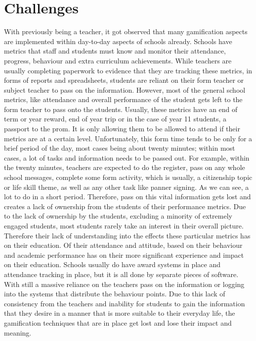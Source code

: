 \documentclass{sigchi}
\begin{document}
\section{Challenges}

With previously being a teacher, it got observed that many gamification aspects are implemented within day-to-day aspects of schools already. Schools have metrics that staff and students must know and monitor their attendance, progress, behaviour and extra curriculum achievements. While teachers are usually completing paperwork to evidence that they are tracking these metrics, in forms of reports and spreadsheets, students are reliant on their form teacher or subject teacher to pass on the information. However, most of the general school metrics, like attendance and overall performance of the student gets left to the form teacher to pass onto the students. Usually, these metrics have an end of term or year reward, end of year trip or in the case of year 11 students, a passport to the prom. It is only allowing them to be allowed to attend if their metrics are at a certain level. Unfortunately, this form time tends to be only for a brief period of the day, most cases being about twenty minutes; within most cases, a lot of tasks and information needs to be passed out. For example, within the twenty minutes, teachers are expected to do the register, pass on any whole school messages, complete some form activity, which is usually, a citizenship topic or life skill theme, as well as any other task like panner signing. As we can see, a lot to do in a short period. Therefore, pass on this vital information gets lost and creates a lack of ownership from the students of their performance metrics. Due to the lack of ownership by the students, excluding a minority of extremely engaged students, most students rarely take an interest in their overall picture. Therefore their lack of understanding into the effects these particular metrics has on their education. Of their attendance and attitude, based on their behaviour and academic performance has on their more significant experience and impact on their education. Schools usually do have award systems in place and attendance tracking in place, but it is all done by separate pieces of software. With still a massive reliance on the teachers pass on the information or logging into the systems that distribute the behaviour points. Due to this lack of consistency from the teachers and inability for students to gain the information that they desire in a manner that is more suitable to their everyday life, the gamification techniques that are in place get lost and lose their impact and meaning. 
\end{document}
